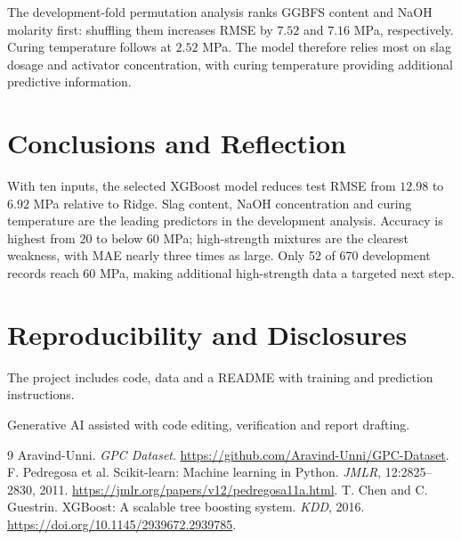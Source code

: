 \documentclass[10pt,a4paper]{article}
\begin{document}
\begin{minipage}{\linewidth}
The development-fold permutation analysis ranks GGBFS content and NaOH molarity first: shuffling them increases RMSE by $7.52$ and $7.16$ MPa, respectively. Curing temperature follows at $2.52$ MPa. The model therefore relies most on slag dosage and activator concentration, with curing temperature providing additional predictive information.
\end{minipage}

\section{Conclusions and Reflection}
With ten inputs, the selected XGBoost model reduces test RMSE from $12.98$ to $6.92$ MPa relative to Ridge. Slag content, NaOH concentration and curing temperature are the leading predictors in the development analysis. Accuracy is highest from 20 to below 60 MPa; high-strength mixtures are the clearest weakness, with MAE nearly three times as large. Only 52 of 670 development records reach 60 MPa, making additional high-strength data a targeted next step.

\section*{Reproducibility and Disclosures}
The project includes code, data and a README with training and prediction instructions.

Generative AI assisted with code editing, verification and report drafting.

\begin{thebibliography}{9}\setlength{\itemsep}{0pt}
 Aravind-Unni. \emph{GPC Dataset}. \url{https://github.com/Aravind-Unni/GPC-Dataset}.
 F. Pedregosa et al. Scikit-learn: Machine learning in Python. \emph{JMLR}, 12:2825--2830, 2011. \url{https://jmlr.org/papers/v12/pedregosa11a.html}.
 T. Chen and C. Guestrin. XGBoost: A scalable tree boosting system. \emph{KDD}, 2016. \url{https://doi.org/10.1145/2939672.2939785}.
\end{thebibliography}
\end{document}
